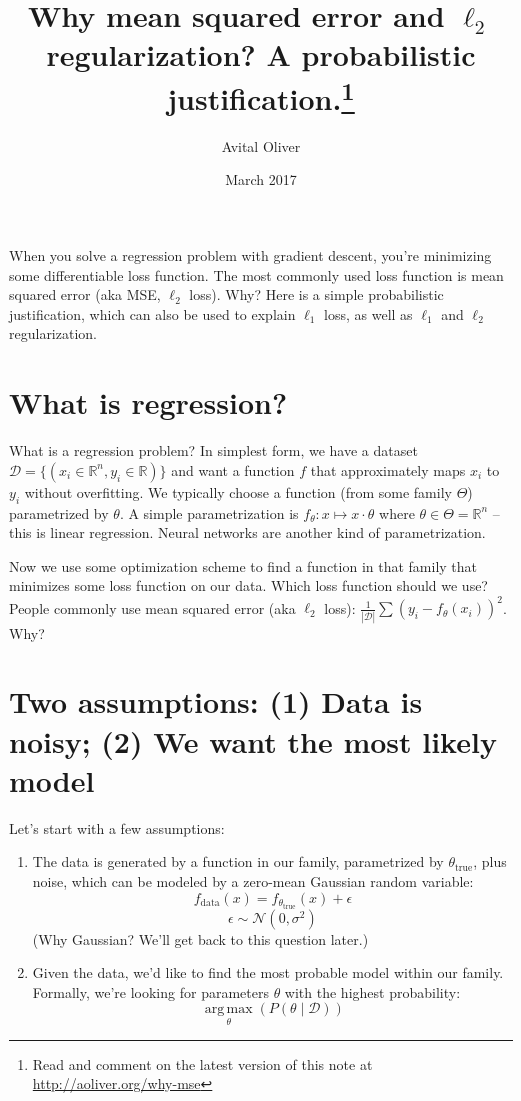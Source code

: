 \documentclass{article}
\title{Why mean squared error and $\ell_2$ regularization? A probabilistic justification.\footnote{Read and comment on the latest version of this note at \url{http://aoliver.org/why-mse}}}
\author{Avital Oliver}
\date{March 2017}
\begin{document}
\maketitle


When you solve a regression problem with gradient descent, you're
minimizing some differentiable loss function. The most commonly used
loss function is mean squared error (aka MSE, $\ell_2$ loss). Why? Here is a simple probabilistic justification, which can also be used to explain $\ell_1$ loss,
 as well as $\ell_1$ and $\ell_2$ regularization.

\section{What is regression?}

What is a regression problem? In simplest form, we have a dataset $\mathcal{D}=\{ (x_i \in \mathbb{R}^n, y_i \in \mathbb{R} ) \}$ and want a function $f$ that approximately maps $x_i$ to $y_i$ without overfitting. We typically choose a function (from some family $\Theta$) parametrized by $\theta$. A simple parametrization is $f_\theta:x \mapsto x \cdot \theta$ where $\theta \in \Theta = \mathbb{R}^n$ -- this is linear regression. Neural networks are another kind of parametrization.

Now we use some optimization scheme to find a function in that family that minimizes some loss function on our data. Which loss function should we use? People commonly use mean squared error (aka $\ell_2$ loss):
$\frac{1}{|\mathcal{D}|}\sum(y_i - f_\theta(x_i))^2$. Why? 

\section{Two assumptions: (1) Data is noisy; (2) We want the most likely model}

Let's start with a few assumptions:
\begin{enumerate}
\item The data is generated by a function in our family, parametrized by $\theta_\text{true}$, plus noise, which can be modeled by a zero-mean Gaussian random variable:
\begin{equation}
f_\text{data}(x) = f_{\theta_\text{true}}(x) + \epsilon
\end{equation}
\begin{equation}
\epsilon \sim \mathcal{N}(0, \sigma^2)
\end{equation}
(Why Gaussian? We'll get back to this question later.)
\item Given the data, we'd like to find the most probable model within our family. Formally,
we're looking for parameters $\theta$ with the highest probability:
\begin{equation}
\operatorname*{arg\,max}_\theta(P(\theta \mid \mathcal{D}))
\end{equation}

\end{enumerate}
\end{document}
